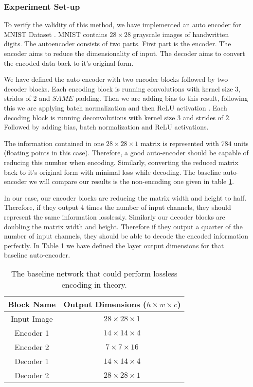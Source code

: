 \subsubsection{Experiment Set-up}
To verify the validity of this method, we have implemented an auto encoder for MNIST Dataset \cite{lecun1998mnist}. MNIST contains $28 \times 28$ grayscale images of handwritten digits. The autoencoder consists of two parts. First part is the encoder. The encoder aims to reduce the dimensionality of input. The decoder aims to convert the encoded data back to it's original form.

We have defined the auto encoder with two encoder blocks followed by two decoder blocks. Each encoding block is running convolutions with kernel size $3$, strides of $2$ and $SAME$ padding. Then we are adding bias to this result, following this we are applying batch normalization \cite{ioffe2015batch} and then ReLU activation \cite{nair2010rectified}. Each decoding block is running deconvolutions with kernel size $3$ and strides of $2$. Followed by adding bias, batch normalization and ReLU activations. 

The information contained in one $28 \times 28 \times 1$ matrix is represented with $784$ units (floating points in this case). Therefore, a good auto-encoder should be capable of reducing this number when encoding. Similarly, converting the reduced matrix back to it's original form with minimal loss while decoding. The baseline auto-encoder we will compare our results is the non-encoding one given in table \ref{tab:mnist_baseline_encoder}.

In our case, our encoder blocks are reducing the matrix width and height to half. Therefore, if they output $4$ times the number of input channels, they should represent the same information losslessly. Similarly our decoder blocks are doubling the matrix width and height. Therefore if they output a quarter of the number of input channels, they should be able to decode the encoded information perfectly. In Table \ref{tab:mnist_baseline_encoder} we have defined the layer output dimensions for that baseline auto-encoder.
\begin{table}
\begin{center}
\begin{tabular}{ c | c }
 Block Name & Output Dimensions ($h \times w \times c$) \\
 \hline
 Input Image & $28 \times 28 \times 1$ \\
 Encoder 1 & $14 \times 14 \times 4$ \\  
 Encoder 2 & $7 \times 7 \times 16$ \\
 Decoder 1 & $14 \times 14 \times 4$ \\  
 Decoder 2 & $28 \times 28 \times 1$ 
\end{tabular}
\end{center}
\caption{The baseline network that could perform lossless encoding in theory.}
\label{tab:mnist_baseline_encoder}
\end{table}

